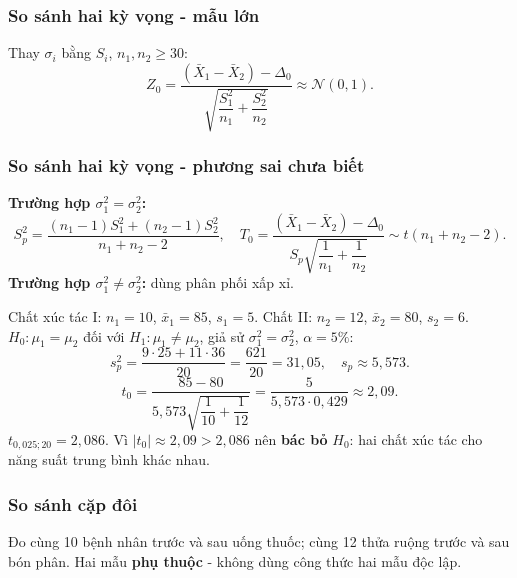 \documentclass[12pt,a4paper]{article}
\begin{document}
\subsubsection{So sánh hai kỳ vọng - mẫu lớn}

\begin{phuongphap}[title={Hai mẫu lớn, $\sigma$ chưa biết}]
  Thay $\sigma_i$ bằng $S_i$, $n_1, n_2 \ge 30$:
  \[
    Z_0 = \dfrac{(\bar{X}_1 - \bar{X}_2) - \Delta_0}{\sqrt{\dfrac{S_1^2}{n_1} + \dfrac{S_2^2}{n_2}}} \approx \mathcal{N}(0,1).
  \]
\end{phuongphap}

\subsubsection{So sánh hai kỳ vọng - phương sai chưa biết}

\begin{congthuc}[title={Hai mẫu độc lập, phương sai chưa biết}]
  \textbf{Trường hợp $\sigma_1^2 = \sigma_2^2$:}
  \[
    S_p^2 = \dfrac{(n_1-1)S_1^2 + (n_2-1)S_2^2}{n_1+n_2-2}, \quad
    T_0 = \dfrac{(\bar{X}_1-\bar{X}_2)-\Delta_0}{S_p\sqrt{\dfrac{1}{n_1}+\dfrac{1}{n_2}}} \sim t(n_1+n_2-2).
  \]
  \textbf{Trường hợp $\sigma_1^2 \ne \sigma_2^2$:} dùng phân phối xấp xỉ.
\end{congthuc}

\begin{vidu}[title={So sánh năng suất hai chất xúc tác}]
Chất xúc tác I: $n_1=10$, $\bar{x}_1=85$, $s_1=5$. Chất II: $n_2=12$, $\bar{x}_2=80$, $s_2=6$.
$H_0: \mu_1=\mu_2$ đối với $H_1: \mu_1 \ne \mu_2$, giả sử $\sigma_1^2=\sigma_2^2$, $\alpha=5\%$:
\[
  s_p^2 = \dfrac{9\cdot 25 + 11\cdot 36}{20} = \dfrac{621}{20} = 31{,}05, \quad s_p \approx 5{,}573.
\]
\[
  t_0 = \dfrac{85-80}{5{,}573\sqrt{\dfrac{1}{10}+\dfrac{1}{12}}} = \dfrac{5}{5{,}573 \cdot 0{,}429} \approx 2{,}09.
\]
$t_{0{,}025;20} = 2{,}086$. Vì $|t_0| \approx 2{,}09 > 2{,}086$ nên \textbf{bác bỏ} $H_0$: hai chất xúc tác cho năng suất trung bình khác nhau.
\end{vidu}

\subsubsection{So sánh cặp đôi}

\begin{dongco}[title={Động cơ - Cùng đối tượng, hai điều kiện}]
Đo cùng 10 bệnh nhân trước và sau uống thuốc; cùng 12 thửa ruộng trước và sau bón phân. Hai mẫu \textbf{phụ thuộc} - không dùng công thức hai mẫu độc lập.
\end{dongco}
\end{document}
